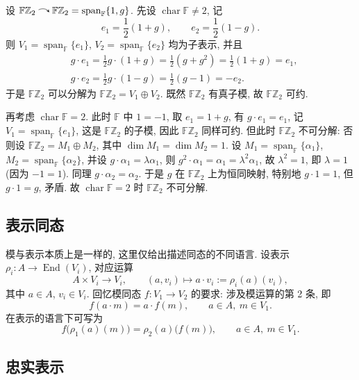 \begin{example}\label{ex:FZ2-semisimple-decomposition}
设 $\mathbb{F}\mathbb{Z}_2\acts \mathbb{F}\mathbb{Z}_2=\operatorname{span}_{\mathbb{F}}\{1,g\}$.
先设 $\operatorname{char}\mathbb{F}\neq2$, 记
\[
  e_1=\frac12(1+g),\qquad e_2=\frac12(1-g).
\]
则 $V_1=\operatorname{span}_{\mathbb{F}}\{e_1\}$, $V_2=\operatorname{span}_{\mathbb{F}}\{e_2\}$ 均为子表示, 并且
\[
  \begin{aligned}
    &g\cdot e_1=\frac12 g\cdot(1+g)=\frac12(g+g^2)=\frac12(1+g)=e_1,\\
    &g\cdot e_2=\frac12 g\cdot(1-g)=\frac12(g-1)=-e_2 .
  \end{aligned}
\]
于是 $\mathbb{F}\mathbb{Z}_2$ 可以分解为 $\mathbb{F}\mathbb{Z}_2=V_1\oplus V_2$. 既然 $\mathbb{F}\mathbb{Z}_2$ 有真子模,
故 $\mathbb{F}\mathbb{Z}_2$ 可约.

再考虑 $\operatorname{char}\mathbb{F}=2$. 此时 $\mathbb{F}$ 中 $1=-1$, 取 $e_1=1+g$, 有 $g\cdot e_1=e_1$,
记 $V_1=\operatorname{span}_{\mathbb{F}}\{e_1\}$, 这是 $\mathbb{F}\mathbb{Z}_2$ 的子模, 因此 $\mathbb{F}\mathbb{Z}_2$ 同样可约.
但此时 $\mathbb{F}\mathbb{Z}_2$ 不可分解: 否则设 $\mathbb{F}\mathbb{Z}_2=M_1\oplus M_2$, 其中
$\dim M_1=\dim M_2=1$. 设 $M_1=\operatorname{span}_{\mathbb{F}}\{\alpha_1\}$, $M_2=\operatorname{span}_{\mathbb{F}}\{\alpha_2\}$,
并设 $g\cdot\alpha_1=\lambda\alpha_1$, 则 $g^2\cdot\alpha_1=\alpha_1=\lambda^2\alpha_1$, 故 $\lambda^2=1$,
即 $\lambda=1$ (因为 $-1=1$). 同理 $g\cdot\alpha_2=\alpha_2$. 于是 $g$ 在 $\mathbb{F}\mathbb{Z}_2$ 上为恒同映射,
特别地 $g\cdot1=1$, 但 $g\cdot1=g$, 矛盾. 故 $\operatorname{char}\mathbb{F}=2$ 时 $\mathbb{F}\mathbb{Z}_2$ 不可分解.
\end{example}

\subsection{表示同态}

模与表示本质上是一样的, 这里仅给出描述同态的不同语言.
设表示 $\rho_i\colon A\to\operatorname{End}(V_i)$, 对应运算
\[
  A\times V_i\longrightarrow V_i,\qquad (a,v_i)\longmapsto a\cdot v_i:=\rho_i(a)(v_i),
\]
其中 $a\in A$, $v_i\in V_i$. 回忆模同态 $f\colon V_1\to V_2$ 的要求: 涉及模运算的第 2 条, 即
\[
  f(a\cdot m)=a\cdot f(m),\qquad a\in A,\ m\in V_1 .
\]
在表示的语言下可写为
\[
  f\bigl(\rho_1(a)(m)\bigr)=\rho_2(a)\bigl(f(m)\bigr),\qquad a\in A,\ m\in V_1 .
\]

\subsection{忠实表示}

